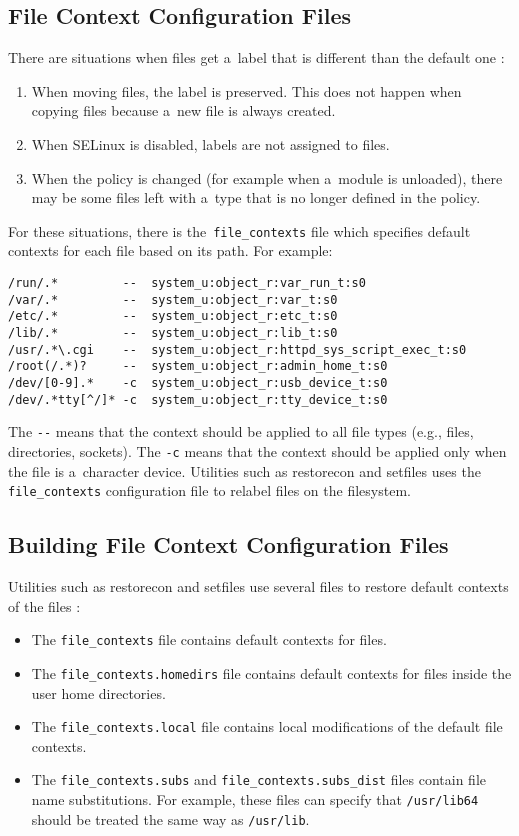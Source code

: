 \subsection{File Context Configuration Files}
There are situations when files get a~label that is different than the default
one \cite{selinuxguide}:
\begin{enumerate}
    \item When moving files, the label is preserved. This does not happen when
        copying files because a~new file is always created.
    \item When SELinux is disabled, labels are not assigned to files.
    \item When the policy is changed (for example when a~module is unloaded),
        there may be some files left with a~type that is no longer defined in
        the policy.
\end{enumerate}
For these situations, there is the~\texttt{file\_contexts} file which specifies
default contexts for each file based on its path. For example:
\begin{lstlisting}
/run/.*         --  system_u:object_r:var_run_t:s0
/var/.*	        --  system_u:object_r:var_t:s0
/etc/.*	        --  system_u:object_r:etc_t:s0
/lib/.*	        --  system_u:object_r:lib_t:s0
/usr/.*\.cgi    --  system_u:object_r:httpd_sys_script_exec_t:s0
/root(/.*)?     --  system_u:object_r:admin_home_t:s0
/dev/[0-9].*    -c  system_u:object_r:usb_device_t:s0
/dev/.*tty[^/]* -c  system_u:object_r:tty_device_t:s0
\end{lstlisting}
The \texttt{-{}-} means that the context should be applied to all file types
(e.g., files, directories, sockets). The \texttt{-c} means that the context
should be applied only when the file is a~character device. Utilities such as
restorecon and setfiles uses the \texttt{file\_contexts} configuration file to
relabel files on the filesystem.

\subsection{Building File Context Configuration Files}
Utilities such as restorecon and setfiles use several files to restore default
contexts of the files \cite[pp.~165--167]{tsn}:
\begin{itemize}
    \item The \texttt{file\_contexts} file contains default contexts for files.
    \item The \texttt{file\_contexts.homedirs} file contains default contexts
        for files inside the user home directories.
    \item The \texttt{file\_contexts.local} file contains local modifications of
        the default file contexts.
    \item The \texttt{file\_contexts.subs} and
        \texttt{file\_contexts.subs\_dist} files contain file name
        substitutions. For example, these files can specify that
        \texttt{/usr/lib64} should be treated the same way as \texttt{/usr/lib}.
\end{itemize}

